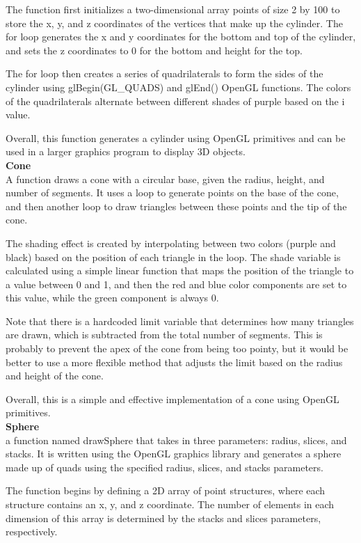 \documentclass[12pt,a4]{article}
\begin{document}
{The function first initializes a two-dimensional array points of size 2 by 100 to store the x, y, and z coordinates of the vertices that make up the cylinder. The for loop generates the x and y coordinates for the bottom and top of the cylinder, and sets the z coordinates to 0 for the bottom and height for the top.

The for loop then creates a series of quadrilaterals to form the sides of the cylinder using glBegin(GL\_QUADS) and glEnd() OpenGL functions. The colors of the quadrilaterals alternate between different shades of purple based on the i value.

Overall, this function generates a cylinder using OpenGL primitives and can be used in a larger graphics program to display 3D objects.\\

\newpage
\textbf{\Large{Cone}}\\
A function draws a cone with a circular base, given the radius, height, and number of segments. It uses a loop to generate points on the base of the cone, and then another loop to draw triangles between these points and the tip of the cone.

The shading effect is created by interpolating between two colors (purple and black) based on the position of each triangle in the loop. The shade variable is calculated using a simple linear function that maps the position of the triangle to a value between 0 and 1, and then the red and blue color components are set to this value, while the green component is always 0.

Note that there is a hardcoded limit variable that determines how many triangles are drawn, which is subtracted from the total number of segments. This is probably to prevent the apex of the cone from being too pointy, but it would be better to use a more flexible method that adjusts the limit based on the radius and height of the cone.

Overall, this is a simple and effective implementation of a cone using OpenGL primitives.\\

\textbf{\Large{Sphere}}\\
a function named drawSphere that takes in three parameters: radius, slices, and stacks. It is written using the OpenGL graphics library and generates a sphere made up of quads using the specified radius, slices, and stacks parameters.

The function begins by defining a 2D array of point structures, where each structure contains an x, y, and z coordinate. The number of elements in each dimension of this array is determined by the stacks and slices parameters, respectively.

}
\end{document}

